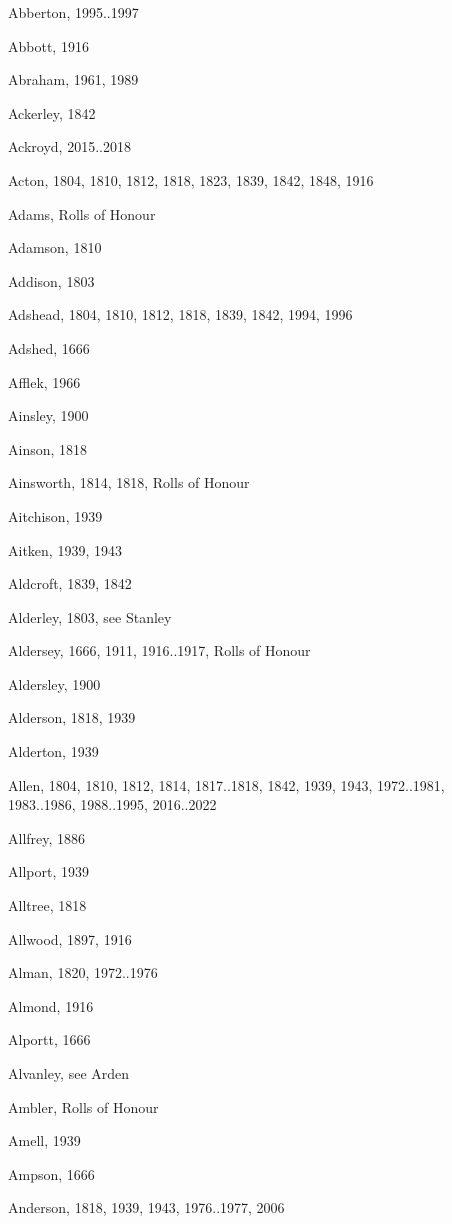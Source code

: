 \renewcommand*{\indexname}{Index of Surnames}
{\sloppy
\begin{theindex}
\item Abberton, 1995..1997
\item Abbott, 1916
\item Abraham, 1961, 1989
\item Ackerley, 1842
\item Ackroyd, 2015..2018
\item Acton, 1804, 1810, 1812, 1818, 1823, 1839, 1842, 1848, 1916
\item Adams, Rolls of Honour
\item Adamson, 1810
\item Addison, 1803
\item Adshead, 1804, 1810, 1812, 1818, 1839, 1842, 1994, 1996
\item Adshed, 1666
\item Afflek, 1966
\item Ainsley, 1900
\item Ainson, 1818
\item Ainsworth, 1814, 1818, Rolls of Honour
\item Aitchison, 1939
\item Aitken, 1939, 1943
\item Aldcroft, 1839, 1842
\item Alderley, 1803, see Stanley
\item Aldersey, 1666, 1911, 1916..1917, Rolls of Honour
\item Aldersley, 1900
\item Alderson, 1818, 1939
\item Alderton, 1939
\item Allen, 1804, 1810, 1812, 1814, 1817..1818, 1842, 1939, 1943, 1972..1981, 1983..1986, 1988..1995, 2016..2022
\item Allfrey, 1886
\item Allport, 1939
\item Alltree, 1818
\item Allwood, 1897, 1916
\item Alman, 1820, 1972..1976
\item Almond, 1916
\item Alportt, 1666
\item Alvanley, see Arden
\item Ambler, Rolls of Honour
\item Amell, 1939
\item Ampson, 1666
\item Anderson, 1818, 1939, 1943, 1976..1977, 2006

\end{theindex}}
